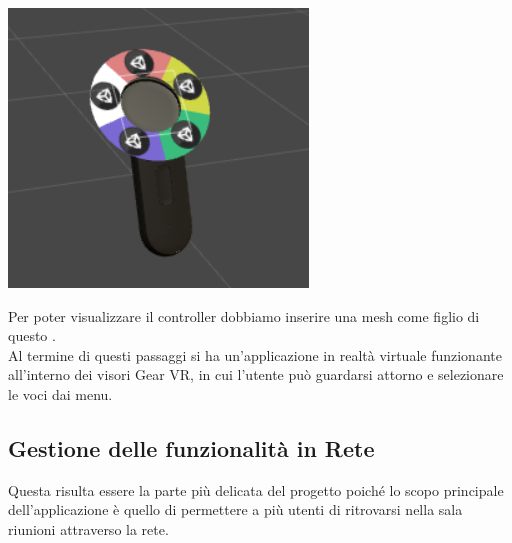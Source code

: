 \begin{minipage}[h]{0.2\textwidth}
	\includegraphics[width=\textwidth]{figure/radial}
	
\end{minipage}


\vspace{0.5cm}
Per poter visualizzare il controller dobbiamo inserire una mesh come figlio di questo .\\

Al termine di questi passaggi si ha un'applicazione in realtà virtuale funzionante all'interno dei visori Gear VR, in cui l'utente può guardarsi attorno e selezionare le voci dai menu.

\subsection{Gestione delle funzionalità in Rete}
Questa risulta essere la parte più delicata del progetto poiché lo scopo principale dell'applicazione è quello di permettere a più utenti di ritrovarsi nella sala riunioni attraverso la rete. \\

